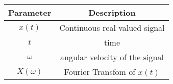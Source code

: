 \renewcommand{\arraystretch}{1.5}
\begin{tabular}{|c|c|}
\hline
Parameter & Description  \\\hline
$x(t)$ & Continuous real valued signal  \\\hline
$t$ & time \\\hline
$\omega$ & angular velocity of the signal \\\hline
$X(\omega)$& Fourier Transfom of $x(t)$\\\hline
\end{tabular}
